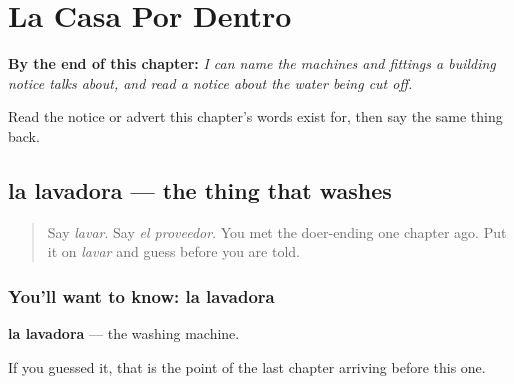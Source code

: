 
\chapter{La Casa Por Dentro}
\label{ch:es-casa-dentro}

\begin{chapteropening}
\textbf{By the end of this chapter:} \emph{I can name the machines and fittings a building notice talks about, and read a notice about the water being cut off.}

Read the notice or advert this chapter's words exist for, then say the same thing back.
\end{chapteropening}

\section[la lavadora]{la lavadora — the thing that washes}

\label{lesson:ES-C432-lavadora}



\begin{quote}
Say \emph{lavar}. Say \emph{el proveedor}. You met the doer-ending one chapter ago. Put it on \emph{lavar} and guess before you are told.
\end{quote}

\subsection*{You'll want to know: la lavadora}
\textbf{la lavadora} — the washing machine.

If you guessed it, that is the point of the last chapter arriving before this one.

